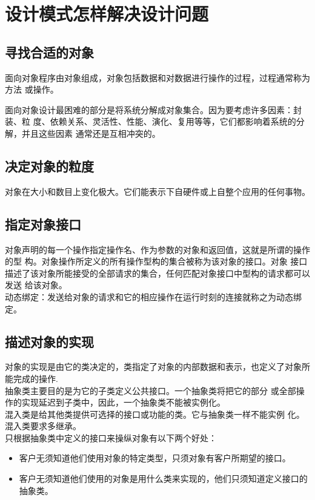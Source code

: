 \section{设计模式怎样解决设计问题}
\subsection{寻找合适的对象}
面向对象程序由对象组成，对象包括数据和对数据进行操作的过程，过程通常称为方法
或操作。
\par 面向对象设计最困难的部分是将系统分解成对象集合。因为要考虑许多因素：封装、粒
度、依赖关系、灵活性、性能、演化、复用等等，它们都影响着系统的分解，并且这些因素
通常还是互相冲突的。
\subsection{决定对象的粒度}
对象在大小和数目上变化极大。它们能表示下自硬件或上自整个应用的任何事物。
\subsection{指定对象接口}
对象声明的每一个操作指定操作名、作为参数的对象和返回值，这就是所谓的操作的型
构。对象操作所定义的所有操作型构的集合被称为该对象的接口。对象
接口描述了该对象所能接受的全部请求的集合，任何匹配对象接口中型构的请求都可以发送
给该对象。
\\ 动态绑定：发送给对象的请求和它的相应操作在运行时刻的连接就称之为动态绑定。
\subsection{描述对象的实现}
对象的实现是由它的类决定的，类指定了对象的内部数据和表示，也定义了对象所能完成的操作.
\\ 抽象类主要目的是为它的子类定义公共接口。一个抽象类将把它的部分
或全部操作的实现延迟到子类中，因此，一个抽象类不能被实例化。
\\ 混入类是给其他类提供可选择的接口或功能的类。它与抽象类一样不能实例
化。混入类要求多继承。
\\ 只根据抽象类中定义的接口来操纵对象有以下两个好处：
\begin{itemize}
	\item 客户无须知道他们使用对象的特定类型，只须对象有客户所期望的接口。
	\item 客户无须知道他们使用的对象是用什么类来实现的，他们只须知道定义接口的抽象类。
\end{itemize}